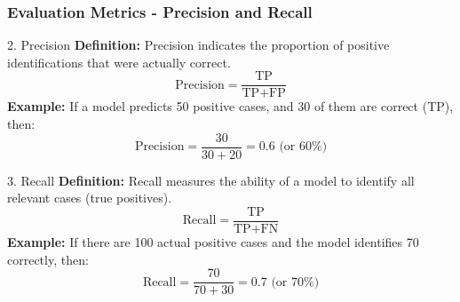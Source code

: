 \documentclass[aspectratio=169]{beamer}
\begin{document}
\begin{frame}[fragile]
    \frametitle{Evaluation Metrics - Precision and Recall}
    \begin{block}{2. Precision}
        \textbf{Definition:} Precision indicates the proportion of positive identifications that were actually correct.
        \begin{equation}
            \text{Precision} = \frac{\text{TP}}{\text{TP} + \text{FP}}
        \end{equation}
        \textbf{Example:} If a model predicts 50 positive cases, and 30 of them are correct (TP), then:
        \begin{equation}
            \text{Precision} = \frac{30}{30 + 20} = 0.6 \text{ (or 60\%)}
        \end{equation}
    \end{block}

    \begin{block}{3. Recall}
        \textbf{Definition:} Recall measures the ability of a model to identify all relevant cases (true positives).
        \begin{equation}
            \text{Recall} = \frac{\text{TP}}{\text{TP} + \text{FN}}
        \end{equation}
        \textbf{Example:} If there are 100 actual positive cases and the model identifies 70 correctly, then:
        \begin{equation}
            \text{Recall} = \frac{70}{70 + 30} = 0.7 \text{ (or 70\%)}
        \end{equation}
    \end{block}
\end{frame}
\end{document}
